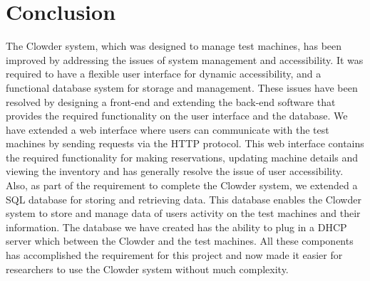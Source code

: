 \chapter{Conclusion}
\label{chap:conclusions}

The Clowder system, which was designed to manage test machines, has been improved by addressing the issues of system management and accessibility. It was required to have a flexible user interface for dynamic accessibility, and a functional database system for storage and management. These issues have been resolved by designing a front-end and extending the back-end  software that provides the required functionality on the user interface and the database. We have extended a web interface where users can communicate with the test machines by sending requests via the HTTP protocol. This web interface contains the required functionality for making reservations, updating machine details and viewing the inventory and has generally resolve the issue of user accessibility. Also, as part of the requirement to complete the Clowder system, we extended a SQL database for storing and retrieving data. This database enables the Clowder system to store and manage data of users  activity on the test machines and their information. The database we have created has the ability to plug in a DHCP server which between the Clowder and the test machines. All these components has accomplished the requirement for this project and now made it easier for researchers to use the Clowder system without much complexity. 
